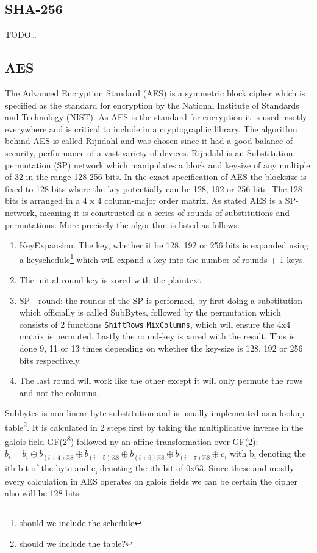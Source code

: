 \documentclass[a4paper]{article}
\begin{document}
\subsection{SHA-256}
\label{sec:orgeec3717}
TODO\ldots{}
\subsection{AES}
\label{sec:org7288e7c}
The Advanced Encryption Standard (AES) is a symmetric block cipher which is specified as the standard for encryption by the National Institute of Standards and Technology (NIST). As AES is the standard for encryption it is used msotly everywhere and is critical to include in a cryptographic library. The algorithm behind AES is called Rijndahl and was chosen since it had a good balance of security, performance of a vast variety of devices\cite{AESofficial}. Rijndahl is an Substitution-permutation (SP) network which manipulates a block and keysize of any multiple of 32 in the range 128-256 bits. In the exact specification of AES the blocksize is fixed to 128 bits where the key potentially can be 128, 192 or 256 bits. The 128 bits is arranged in a 4 x 4 column-major order matrix. As stated AES is a SP-network, meaning it is constructed as a series of rounds of substitutions and permutations. More precisely the algorithm is listed as follows:
\begin{enumerate}
\item KeyExpansion: The key, whether it be 128, 192 or 256 bits is expanded using a keyschedule\footnote{should we include the schedule} which will expand a key into the number of rounds + 1 keys.
\item The initial round-key is xored with the plaintext.
\item SP - round: the rounds of the SP is performed, by first doing a substitution which officially is called SubBytes\cite{Rijndahl}, followed by the permutation which consists of 2 functions \texttt{ShiftRows} \texttt{MixColumns}, which will ensure the 4x4 matrix is permuted. Lastly the round-key is xored with the result. This is done 9, 11 or 13 times depending on whether the key-size is 128, 192 or 256 bits respectively.
\item The last round will work like the other except it will only permute the rows and not the columns.
\end{enumerate}

Subbytes is non-linear byte substitution and is usually implemented as a lookup table\footnote{should we include the table?}. It is calculated in 2 steps first by taking the multiplicative inverse in the galois field GF(2\textsuperscript{8}) followed ny an affine transformation over GF(2):
\(b_i = b_i \oplus b_{(i+4) \% 8} \oplus b_{(i+5) \% 8} \oplus b_{(i+6) \% 8} \oplus b_{(i+7) \% 8} \oplus c_i\) with b\textsubscript{i} denoting the ith bit of the byte and c\textsubscript{i} denoting the ith bit of 0x63. Since these and mostly every calculation in AES operates on galois fields we can be certain the cipher also will be 128 bits.
\end{document}
